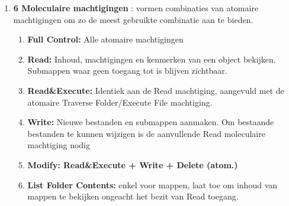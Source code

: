 \begin{itemize}
\begin{enumerate}
\item \textbf{6 Moleculaire machtigingen }: vormen combinaties van atomaire machtigingen om zo de meest gebruikte combinatie aan te bieden.
\begin{enumerate}
\item \textbf{Full Control:} Alle atomaire machtigingen
\item \textbf{Read:} Inhoud, machtigingen en kenmerken van een object bekijken. Submappen waar geen toegang tot is blijven zichtbaar.
\item \textbf{Read\&Execute:} Identiek aan de Read machtiging, aangevuld met de atomaire Traverse Folder/Execute File machtiging.
\item \textbf{Write:} Nieuwe bestanden en submappen aanmaken. Om bestaande bestanden te kunnen wijzigen is de aanvullende Read moleculaire machtiging nodig
\item \textbf{Modify: Read\&Execute + Write + Delete (atom.)}
\item \textbf{List Folder Contents:} enkel voor mappen, laat toe om inhoud van mappen te bekijken ongeacht het bezit van Read toegang.
\end{enumerate}
\end{enumerate}


\end{itemize}

